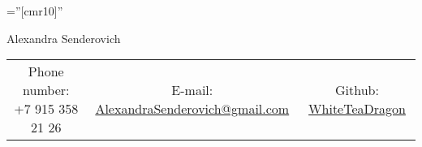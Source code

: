 \documentclass[a4paper,10pt]{article}
\begin{document}

\pagestyle{empty} %

\font\fb=''[cmr10]'' %

\par{\centering
		{\Huge Alexandra Senderovich
	}\bigskip\par}


\begin{center}
\begin{tabular}{c c c}
     Phone number: +7 915 358 21 26 & E-mail: \href{mailto:alexandrasenderovich@gmail.com}{AlexandraSenderovich@gmail.com} & Github: \href{https://github.com/WhiteTeaDragon}{WhiteTeaDragon}
\end{tabular}
\end{center}

\end{document}
